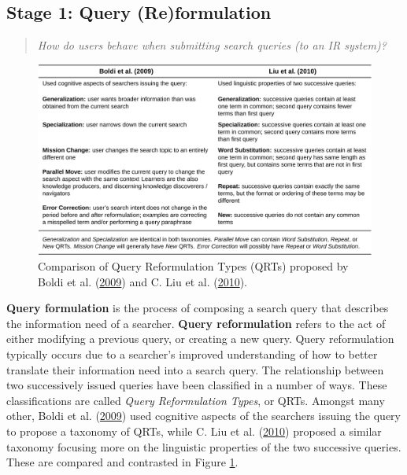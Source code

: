 \documentclass[letterpaper, nobind]{templates/ociamthesis}
\begin{document}
\hypertarget{sec-bg-search-query}{%
\subsection{Stage 1: Query (Re)formulation}\label{sec-bg-search-query}}

\begin{quote}
\emph{How do users behave when submitting search queries (to an IR system)?}
\end{quote}

\begin{figure}

{\centering \includegraphics[width=1\linewidth]{figs/res-Q-QRT-txnmy} 

}

\caption[Comparison of Query Reformulation Types (QRTs) proposed in the literature.]{Comparison of Query Reformulation Types (QRTs) proposed by Boldi et al. (\protect\hyperlink{ref-boldi2009dango}{2009}) and C. Liu et al. (\protect\hyperlink{ref-liu2010analysis}{2010}).}\label{fig:res-Q-QRT-txnmy}
\end{figure}





\textbf{Query formulation} is the process of composing a search query that
describes the information need of a searcher. \textbf{Query reformulation}
refers to the act of either modifying a previous query, or creating a
new query. Query reformulation typically occurs due to a searcher's
improved understanding of how to better translate their information need
into a search query. The relationship between two successively issued
queries have been classified in a number of ways. These classifications
are called \emph{Query Reformulation Types}, or QRTs. Amongst many other,
Boldi et al. (\protect\hyperlink{ref-boldi2009dango}{2009}) used cognitive aspects of the searchers issuing the
query to propose a taxonomy of QRTs, while C. Liu et al. (\protect\hyperlink{ref-liu2010analysis}{2010}) proposed a
similar taxonomy focusing more on the linguistic properties of the two
successive queries. These are compared and contrasted in
Figure \ref{fig:res-Q-QRT-txnmy}.
\end{document}
